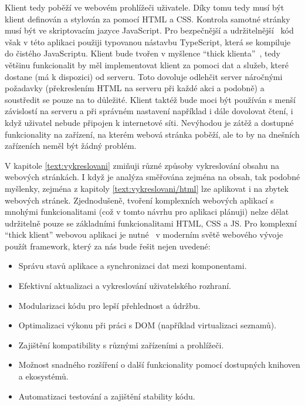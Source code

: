 Klient tedy poběží ve webovém prohlížeči uživatele.
Díky tomu tedy musí být klient definován a stylován za pomocí HTML a CSS.
Kontrola samotné stránky musí být ve skriptovacím jazyce JavaScript.
Pro bezpečnější a udržitelnější~\cite{typescript_docs} kód však v této aplikaci použiji typovanou nástavbu TypeScript, která se kompiluje do čistého JavaScriptu.
Klient bude tvořen v myšlence \enquote{thick klienta}~\cite{uzayr2022frontend}, tedy většinu funkcionalit by měl implementovat klient za pomoci dat a služeb, které dostane (má k dispozici) od serveru.
Toto dovoluje odlehčit server náročnými požadavky (překreslením HTML na serveru při každé akci a podobně) a soustředit se pouze na to důležité.
Klient taktéž bude moci být používán s menší závislostí na serveru a při správném nastavení například i dále dovolovat čtení, i když uživatel nebude připojen k internetové síti.
Nevýhodou je zátěž a dostupné funkcionality na zařízení, na kterém webová stránka poběží, ale to by na dnešních zařízeních neměl být žádný problém.

V kapitole \ref{text:vykreslovani} zmiňuji různé způsoby vykreslování obsahu na webových stránkách.
I když je analýza směřována zejména na obsah, tak podobné myšlenky, zejména z kapitoly \ref{text:vykreslovani/html} lze aplikovat i na zbytek webových stránek.
Zjednodušeně, tvoření komplexních webových aplikací s mnohými funkcionalitami (což v tomto návrhu pro aplikaci plánuji) nelze dělat udržitelně pouze se základními funkcionalitami HTML, CSS a JS.
Pro komplexní \enquote{thick klient} webovou aplikaci je nutné~\cite{uzayr2022frontend} v moderním světě webového vývoje použít framework, který za nás bude řešit nejen uvedené:

\begin{itemize}
    \item Správu stavů aplikace a synchronizaci dat mezi komponentami.
    \item Efektivní aktualizaci a vykreslování uživatelského rozhraní.
    \item Modularizaci kódu pro lepší přehlednost a údržbu.
    \item Optimalizaci výkonu při práci s DOM (například virtualizaci seznamů).
    \item Zajištění kompatibility s různými zařízeními a prohlížeči.
    \item Možnost snadného rozšíření o další funkcionality pomocí dostupných knihoven a ekosystémů.
    \item Automatizaci testování a zajištění stability kódu.
\end{itemize}

